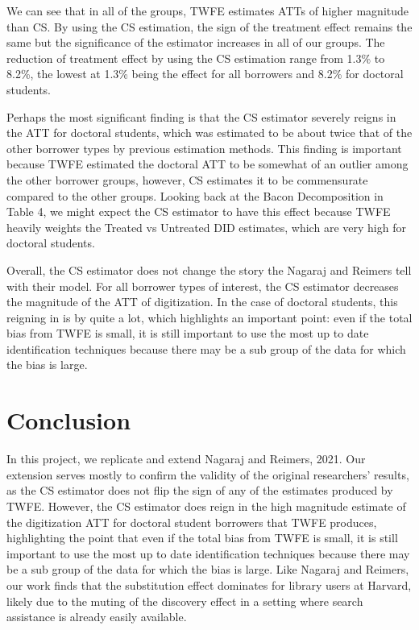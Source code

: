 \documentclass{article}
\begin{document}

 
We can see that in all of the groups, TWFE estimates ATTs of higher magnitude than CS. By using the CS estimation, the sign of the treatment effect remains the same but the significance of the estimator increases in all of our groups. The reduction of treatment effect by using the CS estimation range from 1.3\% to 8.2\%, the lowest at 1.3\% being the effect for all borrowers and 8.2\% for doctoral students.

Perhaps the most significant finding is that the CS estimator severely reigns in the ATT for doctoral students, which was estimated to be about twice that of the other borrower types by previous estimation methods. This finding is important because TWFE estimated the doctoral ATT to be somewhat of an outlier among the other borrower groups, however, CS estimates it to be commensurate compared to the other groups. Looking back at the Bacon Decomposition in Table 4, we might expect the CS estimator to have this effect because TWFE heavily weights the Treated vs Untreated DID estimates, which are very high for doctoral students. 

Overall, the CS estimator does not change the story the Nagaraj and Reimers tell with their model. For all borrower types of interest, the CS estimator decreases the magnitude of the ATT of digitization. In the case of doctoral students, this reigning in is by quite a lot, which highlights an important point: even if the total bias from TWFE is small, it is still important to use the most up to date identification techniques because there may be a sub group of the data for which the bias is large. 
\section{Conclusion}
In this project, we replicate and extend Nagaraj and Reimers, 2021. Our extension serves mostly to confirm the validity of the original researchers' results, as the CS estimator does not flip the sign of any of the estimates produced by TWFE.  However, the CS estimator does reign in the high magnitude estimate of the digitization ATT for doctoral student borrowers that TWFE produces, highlighting the point that even if the total bias from TWFE is small, it is still important to use the most up to date identification techniques because there may be a sub group of the data for which the bias is large. Like Nagaraj and Reimers, our work finds that the substitution effect dominates for library users at Harvard, likely due to the muting of the discovery effect in a setting where search assistance is already easily available. 
\end{document}
